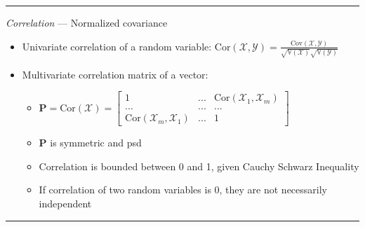 {\color{lightgray}\hrule height 0.001mm}

\emph{Correlation} --- Normalized covariance
\begin{itemize}
    \item Univariate correlation of a random variable: $\textrm{Cor}(\mathcal{X}, \mathcal{Y}) = \frac{\textrm{Cov}(\mathcal{X}, \mathcal{Y})}{\sqrt{\mathbb{V}(\mathcal{X})} \sqrt{\mathbb{V}(\mathcal{Y})}}$ 
    \item Multivariate correlation matrix of a vector: 
    \begin{itemize}
        \item $\boldsymbol{P} = \textrm{Cor}(\boldsymbol{\mathcal{X}}) = \begin{bmatrix}
        1 & ... & \textrm{Cor}(\mathcal{X}_1,\mathcal{X}_m) \\
        ... & ... & ... \\
        \textrm{Cor}(\mathcal{X}_m,\mathcal{X}_1) & ... & 1
        \end{bmatrix}$
        \item $\boldsymbol{P}$ is symmetric and psd
        \item Correlation is bounded between 0 and 1, given Cauchy Schwarz Inequality
        \item If correlation of two random variables is 0, they are not necessarily independent
    \end{itemize}
\end{itemize}

{\color{black}\hrule height 0.001mm}

